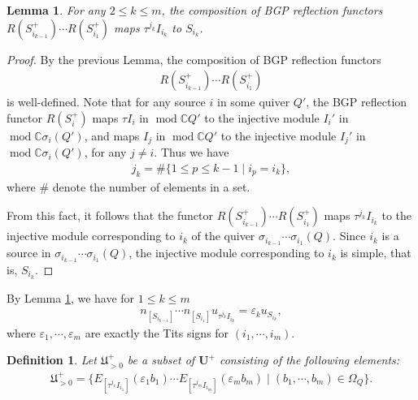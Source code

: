 \documentclass[12pt]{amsart}
\newtheorem{lemma}[theorem]{Lemma}
\newtheorem{definition}[theorem]{Definition}
\begin{document}
\begin{lemma}\label{tauIS}
    For any $2\leq k\leq m$, the composition of BGP reflection functors $R(S_{i_{k-1}}^+)\cdots R(S_{i_1}^+)$ maps $\tau^{j_k}I_{i_k}$ to $S_{i_k}$.
\end{lemma}

\begin{proof}
    By the previous Lemma, the composition of BGP reflection functors
    \begin{align*}
        R(S_{i_{k-1}}^+)\cdots R(S_{i_1}^+)
    \end{align*}
     is well-defined.
    Note that for any source $i$ in some quiver $Q'$, the BGP reflection functor $R(S_i^+)$ maps $\tau I_i$ in $\operatorname{mod}\mathbb{C}Q'$ to the injective module $I_i'$ in $\operatorname{mod}\mathbb{C}\sigma_i(Q')$, and maps $I_j$ in $\operatorname{mod}\mathbb{C}Q'$ to the injective module $I_j'$ in $\operatorname{mod}\mathbb{C}\sigma_i(Q')$, for any $j\neq i$.
    Thus we have 
    \begin{align*}
        j_k=\#\{ 1\leq p\leq k-1 \mid i_p=i_k \},
    \end{align*}
    where $\#$ denote the number of elements in a set.

    From this fact, it follows that the functor $R(S_{i_{k-1}}^+)\cdots R(S_{i_1}^+)$ maps $\tau^{j_k}I_{i_k}$ to the injective module corresponding to $i_k$ of the quiver $\sigma_{i_{k-1}}\cdots\sigma_{i_1}(Q)$.
    Since $i_k$ is a source in $\sigma_{i_{k-1}}\cdots\sigma_{i_1}(Q)$, the injective module corresponding to $i_k$ is simple, that is, $S_{i_k}$.
\end{proof}

By Lemma \ref{tauIS}, we have for $1\leq k\leq m$
\begin{align*}
    n_{[S_{i_{k-1}}]}\cdots n_{[S_{i_1}]}u_{\tau^{j_k}I_{i_k}}=\varepsilon_k u_{S_{i_k}},
\end{align*}
where $\varepsilon_1,\cdots,\varepsilon_m$ are exactly the Tits signs for $(i_1,\cdots,i_m)$.

\begin{definition}
    Let $\mathfrak{U}^+_{>0}$ be a subset of $\mathbf{U}^+$ consisting of the following elements:
    \begin{align*}
        \mathfrak{U}^+_{>0}=\{ E_{[\tau^{j_1}I_{i_1}]}(\varepsilon_1b_1)\cdots  E_{[\tau^{j_m}I_{i_m}]}(\varepsilon_mb_m) \mid (b_1,\cdots,b_m)\in \Omega_Q \}.
    \end{align*}
\end{definition}
\end{document}
